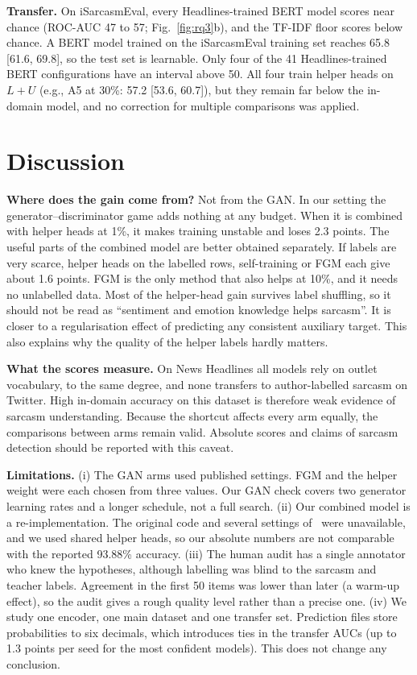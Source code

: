 \documentclass[conference]{IEEEtran}
\begin{document}
\textbf{Transfer.} On iSarcasmEval, every Headlines-trained BERT model scores near chance (ROC-AUC 47 to 57; Fig.~\ref{fig:rq3}b), and the TF-IDF floor scores below chance. A BERT model trained on the iSarcasmEval training set reaches 65.8 [61.6, 69.8], so the test set is learnable. Only four of the 41 Headlines-trained BERT configurations have an interval above 50. All four train helper heads on $L{+}U$ (e.g., A5 at 30\%: 57.2 [53.6, 60.7]), but they remain far below the in-domain model, and no correction for multiple comparisons was applied.

\section{Discussion}

\textbf{Where does the gain come from?} Not from the GAN. In our setting the generator--discriminator game adds nothing at any budget. When it is combined with helper heads at 1\%, it makes training unstable and loses 2.3 points. The useful parts of the combined model are better obtained separately. If labels are very scarce, helper heads on the labelled rows, self-training or FGM each give about 1.6 points. FGM is the only method that also helps at 10\%, and it needs no unlabelled data. Most of the helper-head gain survives label shuffling, so it should not be read as ``sentiment and emotion knowledge helps sarcasm''. It is closer to a regularisation effect of predicting any consistent auxiliary target. This also explains why the quality of the helper labels hardly matters.

\textbf{What the scores measure.} On News Headlines all models rely on outlet vocabulary, to the same degree, and none transfers to author-labelled sarcasm on Twitter. High in-domain accuracy on this dataset is therefore weak evidence of sarcasm understanding. Because the shortcut affects every arm equally, the comparisons between arms remain valid. Absolute scores and claims of sarcasm detection should be reported with this caveat.

\textbf{Limitations.} (i) The GAN arms used published settings. FGM and the helper weight were each chosen from three values. Our GAN check covers two generator learning rates and a longer schedule, not a full search. (ii) Our combined model is a re-implementation. The original code and several settings of~\cite{irfan2025seed} were unavailable, and we used shared helper heads, so our absolute numbers are not comparable with the reported 93.88\% accuracy. (iii) The human audit has a single annotator who knew the hypotheses, although labelling was blind to the sarcasm and teacher labels. Agreement in the first 50 items was lower than later (a warm-up effect), so the audit gives a rough quality level rather than a precise one. (iv) We study one encoder, one main dataset and one transfer set. Prediction files store probabilities to six decimals, which introduces ties in the transfer AUCs (up to 1.3 points per seed for the most confident models). This does not change any conclusion.
\end{document}
